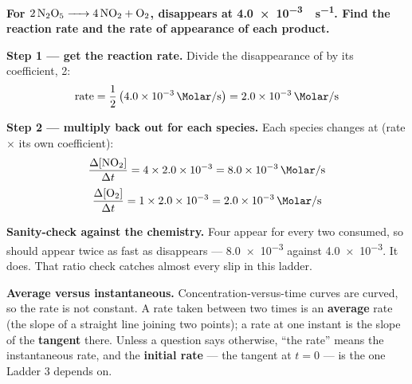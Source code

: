 \documentclass{apchem-worksheet}
\begin{document}
\begin{workedexample}
\textbf{For $\ce{2N2O5 -> 4NO2 + O2}$,  disappears at
\SI{4.0e-3}{\Molar\per\second}. Find the reaction rate and the rate of
appearance of each product.}

\textbf{Step 1 --- get the reaction rate.} Divide the disappearance of
 by its coefficient, 2:
\[ \text{rate} = \frac{1}{2}\left(\SI{4.0e-3}{\Molar\per\second}\right)
   = \SI{2.0e-3}{\Molar\per\second} \]

\textbf{Step 2 --- multiply back out for each species.} Each species
changes at (rate $\times$ its own coefficient):
\[ \frac{\Delta[\ce{NO2}]}{\Delta t}
   = 4 \times \SI{2.0e-3}{} = \SI{8.0e-3}{\Molar\per\second} \]
\[ \frac{\Delta[\ce{O2}]}{\Delta t}
   = 1 \times \SI{2.0e-3}{} = \SI{2.0e-3}{\Molar\per\second} \]

\textbf{Sanity-check against the chemistry.} Four  appear for
every two  consumed, so  should appear twice as fast as
 disappears --- \SI{8.0e-3}{} against \SI{4.0e-3}{}. It does.
That ratio check catches almost every slip in this ladder.

\textbf{Average versus instantaneous.} Concentration-versus-time curves
are curved, so the rate is not constant. A rate taken between two times
is an \textbf{average} rate (the slope of a straight line joining two
points); a rate at one instant is the slope of the \textbf{tangent}
there. Unless a question says otherwise, ``the rate'' means the
instantaneous rate, and the \textbf{initial rate} --- the tangent at
$t = 0$ --- is the one Ladder 3 depends on.
\end{workedexample}
\end{document}

